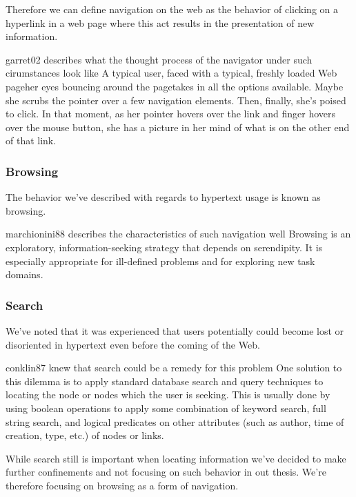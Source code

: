 Therefore we can define navigation on the web as the behavior of clicking on
a hyperlink in a web page where this act results in the presentation of
new information.
\begin{fullquote}{garret02}{%
  describes what the thought process of the navigator under
  such cirumstances look like}
    A typical user, faced with a typical, freshly loaded Web page\dash{}her
    eyes bouncing around the page\dash{}takes in all the options available.
    Maybe she scrubs the pointer over a few navigation elements. Then,
    finally, she's poised to click. In that moment, as her pointer hovers over
    the link and finger hovers over the mouse button, she has a picture in her
    mind of what is on the other end of that link.
\end{fullquote}

\subsubsection{Browsing}
The behavior we've described with regards to hypertext usage is known as
browsing.
\begin{fullquote}[\p{71}]{marchionini88}{%
  describes the characteristics of such navigation well}
    Browsing is an exploratory, information-seeking
    strategy that depends on serendipity. It is
    especially appropriate for ill-defined problems
    and for exploring new task domains.
\end{fullquote}

\subsubsection{Search}
\label{section:background.navigation.navigation.on.the.web.search}
We've noted that it was experienced that users potentially could become lost
or disoriented in hypertext even before the coming of the Web.
\begin{fullquote}[\p{38}]{conklin87}{%
  knew that search could be a remedy for this problem}
    One solution to this dilemma is to apply standard data\-base search and
    query techniques to locating the node or nodes which the user is seeking.
    This is usually done by using boolean operations to apply some combination
    of keyword search, full string search, and logical predicates on other
    attributes (such as author, time of creation, type, etc.)
    of nodes or links.
\end{fullquote}

While search still is important when locating information we've decided
to make further confinements and not focusing on such behavior in out thesis.
We're therefore focusing on browsing as a form of navigation.

